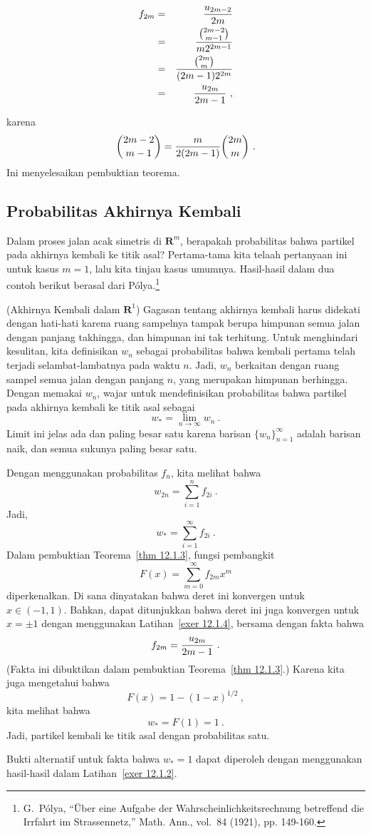 \begin{theorem}
\begin{eqnarray*}
f_{2m} &=& {u_{2m-2}\over{2m}}\\
       &=& {2m-2 \choose m-1}\over{m2^{2m-1}}\\
       &=& {2m \choose m}\over{(2m-1)2^{2m}}\\
       &=& {u_{2m}\over{2m-1}}\ ,
\end{eqnarray*}

karena
$${2m-2 \choose m-1} = {m\over{2(2m-1)}}{2m\choose m}\ .$$
Ini menyelesaikan pembuktian teorema.
\end{theorem}
\subsection*{Probabilitas Akhirnya Kembali}
Dalam proses jalan acak simetris di ${\mathbf R}^m$, berapakah probabilitas bahwa partikel
pada akhirnya kembali ke titik asal?  Pertama-tama kita telaah pertanyaan ini untuk kasus $m = 1$, lalu
kita tinjau kasus umumnya.  Hasil-hasil dalam dua contoh berikut berasal dari
P\'olya.\footnote{G.~P\'olya, ``\"Uber eine Aufgabe der Wahrscheinlichkeitsrechnung betreffend
die Irrfahrt im Strassennetz,'' Math. Ann., vol.~84 (1921), pp. 149-160.}
\begin{example}\label{exam 12.1.0.5}(Akhirnya Kembali dalam ${\mathbf R}^1$)
Gagasan tentang akhirnya kembali harus didekati dengan hati-hati karena
ruang sampelnya tampak berupa himpunan semua jalan dengan panjang takhingga, dan himpunan ini
tak terhitung.  Untuk menghindari kesulitan, kita definisikan $w_n$ sebagai probabilitas bahwa kembali
pertama telah terjadi selambat-lambatnya pada waktu $n$.  Jadi, $w_n$ berkaitan dengan ruang sampel semua jalan
dengan panjang $n$, yang merupakan himpunan berhingga.  Dengan memakai $w_n$, wajar untuk mendefinisikan
probabilitas bahwa partikel pada akhirnya kembali ke titik asal sebagai 
$$w_* = \lim_{n \rightarrow \infty} w_n\ .$$
Limit ini jelas ada dan paling besar satu karena barisan $\{w_n\}_{n = 1}^\infty$ adalah
barisan naik, dan semua sukunya paling besar satu.  
\par
Dengan menggunakan probabilitas $f_n$, kita melihat bahwa
$$w_{2n} = \sum_{i = 1}^n f_{2i}\ .$$
Jadi, 
$$w_* = \sum_{i = 1}^\infty f_{2i}\ .$$
Dalam pembuktian Teorema~\ref{thm 12.1.3}, fungsi pembangkit 
$$F(x) = \sum_{m = 0}^\infty f_{2m}x^m$$ 
diperkenalkan.  Di sana dinyatakan bahwa deret ini konvergen untuk $x \in (-1, 1)$.  Bahkan,
dapat ditunjukkan bahwa deret ini juga konvergen untuk $x = \pm 1$ dengan menggunakan Latihan~\ref{exer
12.1.4}, bersama dengan fakta bahwa
$$f_{2m} = {{u_{2m}}\over{2m-1}}\ .$$
(Fakta ini dibuktikan dalam pembuktian Teorema~\ref{thm 12.1.3}.)  Karena kita juga mengetahui bahwa 
$$F(x) = 1 - (1-x)^{1/2}\ ,$$
kita melihat bahwa 
$$w_* = F(1) = 1\ .$$
Jadi, partikel kembali ke titik asal dengan probabilitas satu.
\par
Bukti alternatif untuk fakta bahwa $w_* = 1$ dapat diperoleh dengan menggunakan
hasil-hasil dalam Latihan~\ref{exer 12.1.2}.
\end{example}
